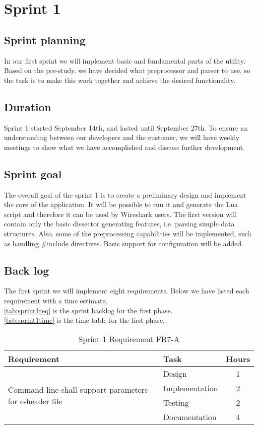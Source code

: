 \chapter{Sprint 1}

\section{Sprint planning}
In our first sprint we will implement basic and fundamental parts of the utility. Based on the pre-study, we have decided what preprocessor and parser to use, so the task is to make this work together and achieve the desired functionality.  

\section{Duration}
Sprint 1 started September 14th, and lasted until September 27th. To ensure an understanding between our developers and the customer, we will have weekly meetings to show what we have accomplished and discuss further development. 

\section{Sprint goal}
The overall goal of the sprint 1 is to create a preliminary design and implement the core of the application. It will be possible to run it and generate the Lua script and therefore it can be used by Wireshark users. The first version will contain only the basic dissector generating features, i.e. parsing simple data structures. Also, some of the preprocessing capabilities will be implemented, such as handling \#include directives. Basic support for configuration will be added.

\section{Back log}
The first sprint we will implement eight requirements. Below we have listed each requirement with a time estimate.\\
\autoref{tab:sprint1req} is the sprint backlog for the first phase. \\
\autoref{tab:sprint1time} is the time table for the first phase. \\
\begin{table}[ht] \small \center
\caption{Sprint 1 Requirement FR7-A}
\begin{tabular}{l l c}
	\toprule
	Requirement & Task & Hours \\
	\midrule
	\multirow{4}{5cm}{Command line shall support parameters for c-header file} & Design & 1 \\
	& Implementation & 2 \\
	& Testing & 2 \\
	& Documentation & 4 \\
	\bottomrule
\end{tabular}
\end{table}

